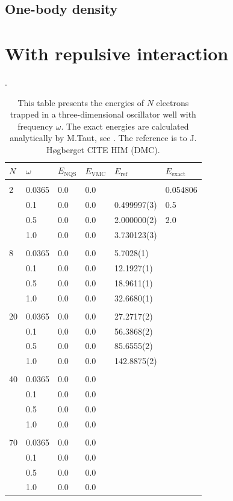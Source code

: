 \subsection{One-body density}


\section{With repulsive interaction}
\begin{table} [H]
	\caption{This table presents the energies of $N$ electrons trapped in a three-dimensional oscillator well with frequency $\omega$. The exact energies are calculated analytically by M.Taut, see \cite{taut_two_1993}. The reference is to J. Høgberget CITE HIM (DMC). }. 
	\begin{tabularx}{\textwidth}{X:X|XXXX} \hline\hline
		\label{tab:quantumdotswinteraction3D}
		$N$ & $\omega$ & $E_{\text{NQS}}$ & $E_{\text{VMC}}$ & $E_{\text{ref}} $ & $E_{\text{exact}}$ \\ \hline \\
		2 & 0.0365 & 0.0 & 0.0 &  & 0.054806 \\ 
		& 0.1 & 0.0 & 0.0 & 0.499997(3) & 0.5 \\
		& 0.5 & 0.0 & 0.0 & 2.000000(2) & 2.0 \\
		& 1.0 & 0.0 & 0.0 & 3.730123(3) &  \\ \hdashline \\
		
		8 & 0.0365 & 0.0 & 0.0 & 5.7028(1) \\ 
		& 0.1 & 0.0 & 0.0 & 12.1927(1) \\
		& 0.5 & 0.0 & 0.0 & 18.9611(1) \\
		& 1.0 & 0.0 & 0.0 & 32.6680(1) \\ \hdashline \\
		
		20 & 0.0365 & 0.0 & 0.0 & 27.2717(2) \\ 
		& 0.1 & 0.0 & 0.0 & 56.3868(2) \\
		& 0.5 & 0.0 & 0.0 & 85.6555(2) \\
		& 1.0 & 0.0 & 0.0 & 142.8875(2) \\ \hdashline \\
		
		40 & 0.0365 & 0.0 & 0.0 \\ 
		& 0.1 & 0.0 & 0.0 \\
		& 0.5 & 0.0 & 0.0 \\
		& 1.0 & 0.0 & 0.0 \\ \hdashline \\
		
		70 & 0.0365 & 0.0 & 0.0 \\ 
		& 0.1 & 0.0 & 0.0 \\
		& 0.5 & 0.0 & 0.0 \\
		& 1.0 & 0.0 & 0.0 \\ \hline\hline
	\end{tabularx}
\end{table}
